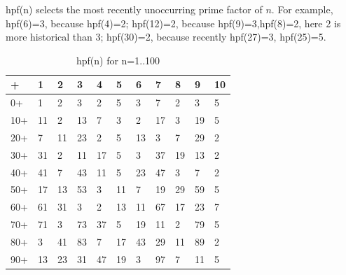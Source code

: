 \documentclass[12pt,a4paper,reqno]{amsart}
\numberwithin{equation}{section}
\theoremstyle{plain}
\theoremstyle{definition}
\begin{document}
	hpf(n) selects the most recently unoccurring prime factor of $n$. For example, 
	hpf(6)=3, because hpf(4)=2; hpf(12)=2, because hpf(9)=3,hpf(8)=2, here 2 is more 
	historical than 3; hpf(30)=2, because recently hpf(27)=3, hpf(25)=5. 
	
	\begin{table}[h!]
		\caption{hpf(n) for n=1..100}
		\label{table:1}
		\begin{tabular}{lllllllllll}
		+  & 1  & 2  & 3  & 4  & 5  & 6  & 7  & 8  & 9  & 10 \\
		\hline
		 0+ & 1  & 2  & 3  & 2  & 5  & 3  & 7  & 2  & 3  & 5 \\
		10+ & 11 & 2  & 13 & 7  & 3  & 2  & 17 & 3  & 19 & 5 \\
		20+ & 7  & 11 & 23 & 2  & 5  & 13 & 3  & 7  & 29 & 2 \\
		30+ & 31 & 2  & 11 & 17 & 5  & 3  & 37 & 19 & 13 & 2 \\
		40+ & 41 & 7  & 43 & 11 & 5  & 23 & 47 & 3  & 7  & 2 \\
		50+ & 17 & 13 & 53 & 3  & 11 & 7  & 19 & 29 & 59 & 5 \\
		60+ & 61 & 31 & 3  & 2  & 13 & 11 & 67 & 17 & 23 & 7 \\
		70+ & 71 & 3  & 73 & 37 & 5  & 19 & 11 & 2  & 79 & 5 \\
		80+ & 3  & 41 & 83 & 7  & 17 & 43 & 29 & 11 & 89 & 2 \\
		90+ & 13 & 23 & 31 & 47 & 19 & 3  & 97 & 7  & 11 & 5
		\end{tabular}
	\end{table}
\end{document}
